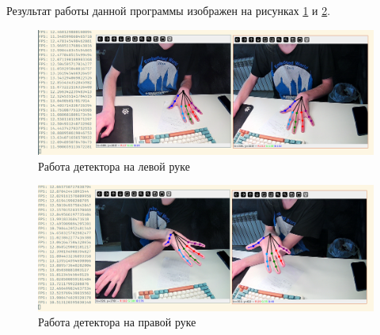 \documentclass[12pt, a4paper]{article}
\begin{document}
Результат работы данной программы изображен на рисунках \ref{fig:run-detection-screenshots-1} и \ref{fig:run-detection-screenshots-2}.
\begin{figure}[!hp]
  \includegraphics[width=\linewidth]{images/run-detection-screenshots/run-detection-1.png}
  \caption{Работа детектора на левой руке}\label{fig:run-detection-screenshots-1}
\end{figure}
\begin{figure}[!hp]
  \includegraphics[width=\linewidth]{images/run-detection-screenshots/run-detection-2.png}
  \caption{Работа детектора на правой руке}\label{fig:run-detection-screenshots-2}
\end{figure}
\end{document}

